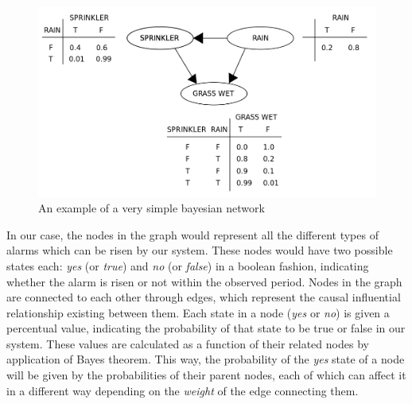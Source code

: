 \documentclass[a4paper,12pt]{article}
\begin{document}
\begin{figure}[hbtp]
\includegraphics[width=\textwidth]{img/bayesian_example.png}
\caption{An example of a very simple bayesian network} \label{fig:bayesian_example}
\end{figure}

In our case, the nodes in the graph would represent all the different types of alarms which can be risen by our system. These nodes would have two possible states each: \emph{yes} (or \emph{true}) and \emph{no} (or \emph{false}) in a boolean fashion, indicating whether the alarm is risen or not within the observed period. Nodes in the graph are connected to each other through edges, which represent the causal influential relationship existing between them. Each state in a node (\emph{yes} or \emph{no}) is given a percentual value, indicating the probability of that state to be true or false in our system. These values are calculated as a function of their related nodes by application of Bayes theorem. This way, the probability of the \emph{yes} state of a node will be given by the probabilities of their parent nodes, each of which can affect it in a different way depending on the \emph{weight} of the edge connecting them.
\end{document}
